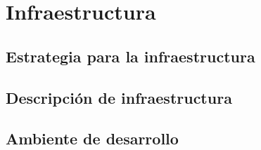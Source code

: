 \section{Infraestructura}
\label{chapter:infraestructura}

\tinylipsum

\subsection{Estrategia para la infraestructura}\label{subsection:infra_estrategia}

\tinylipsum

\subsection{Descripción de infraestructura}\label{subsection:infra_descripcion}

\tinylipsum

\subsection{Ambiente de desarrollo}\label{subsection:infra_desarrollo}

\tinylipsum

